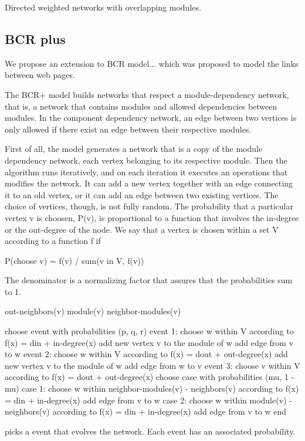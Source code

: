 Directed weighted networks with overlapping modules.
\cite{Lancichinetti2009}

\subsection{BCR plus}

We propose an extension to BCR model... which was proposed to model the links
between web pages.
\cite{Bollobas2003}

The BCR+ model builds networks that respect a module-dependency network, that
is, a network that contains modules and allowed dependencies between modules. 
In the component dependency network, an edge between two vertices is only
allowed if there exist an edge between their respective modules.

First of all, the model generates a network that is a copy of the module
dependency network, each vertex belonging to its respective module. Then the
algorithm runs iteratively, and on each iteration it executes an operations that
modifies the network. It can add a new vertex together with an edge connecting it
to an old vertex, or it can add an edge between two existing vertices. The
choice of vertices, though, is not fully random. The probability that a
particular vertex v is choosen, P(v), is proportional to a function that involves the
in-degree or the out-degree of the node. We say that a vertex is chosen within a
set V according to a function f if

P(choose v) = f(v) / sum(v in V, f(v))

The denominator is a normalizing factor that assures that the probabilities sum
to 1.

out-neighbors(v) 
module(v)
neighbor-modules(v)

choose event with probabilities (p, q, r)
event 1:
  choose w within V according to f(x) = din + in-degree(x)
  add new vertex v to the module of w
  add edge from v to w
event 2:
  choose w within V according to f(x) = dout + out-degree(x)
  add new vertex v to the module of w
  add edge from w to v
event 3:
  choose v within V according to f(x) = dout + out-degree(x)
  choose case with probabilities (mu, 1 - mu)
  case 1: %
    choose w within neighbor-modules(v) - neighbors(v) according to f(x) = din + in-degree(x)
    add edge from v to w
  case 2:
    choose w within module(v) - neighbors(v) according to f(x) = din + in-degree(x)
    add edge from v to w
end

picks a event that evolves
the network. Each event has an associated probability.


